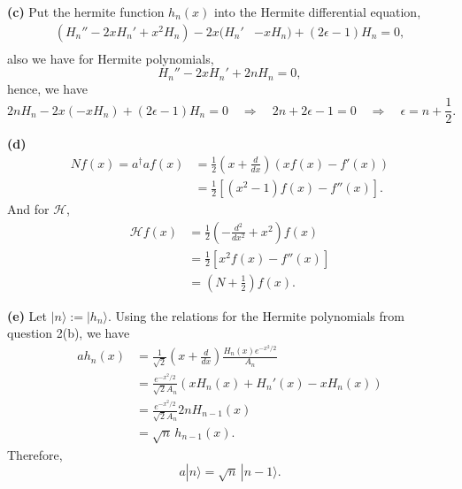 \documentclass[12pt]{article}
\begin{document}
\smallbreak
\noindent\textbf{(c)} \quad Put the hermite function $h_n(x)$ into the Hermite differential equation,
\begin{equation}
\begin{aligned}
    (H_n''-2xH_n'+x^2H_n) -2x(H_n'&-xH_n)+(2\epsilon -1)H_n = 0,\\
\end{aligned}
\end{equation}
also we have for Hermite polynomials,
\begin{equation}
    H_n''-2xH_n'+2nH_n = 0,
\end{equation}
hence, we have
\begin{equation}
    2nH_n - 2x(-xH_n) + (2\epsilon -1)H_n = 0 \quad \Longrightarrow \quad 2n + 2\epsilon -1 = 0 \quad \Longrightarrow \quad \epsilon = n + \frac{1}{2}.
\end{equation}  

\pagebreak
\noindent\textbf{(d)} \quad 
\begin{equation}
\begin{aligned}
    N f(x) = a^{\dagger}a f(x) &= \frac{1}{2} (x + \tfrac{d}{dx})(xf(x)-f'(x)) \\
    &= \frac{1}{2}[(x^2-1)f(x)-f''(x)].
\end{aligned}
\end{equation}
And for $\mathcal{H}$,
\begin{equation}
\begin{aligned}
    \mathcal{H}f(x) &= \frac{1}{2}(-\tfrac{d^2}{dx^2} + x^2)f(x)\\
    &= \frac{1}{2}[x^2f(x)-f''(x)]\\
    &= (N + \tfrac{1}{2})f(x).
\end{aligned}
\end{equation}

\smallbreak
\noindent\textbf{(e)} \quad 
Let $|n\rangle := |h_n\rangle$. Using the relations for the Hermite polynomials from question 2(b), we have
\begin{equation}
\begin{aligned}
a h_n(x)
&= \frac{1}{\sqrt{2}}\left(x+\frac{d}{dx}\right)
   \frac{H_n(x)e^{-x^2/2}}{A_n}\\
&= \frac{e^{-x^2/2}}{\sqrt{2}A_n}
   \left(xH_n(x)+H_n'(x)-xH_n(x)\right)\\
&= \frac{e^{-x^2/2}}{\sqrt{2}A_n}2nH_{n-1}(x)\\
&= \sqrt{n}\,h_{n-1}(x).
\end{aligned}
\end{equation}
Therefore,
\begin{equation}
a|n\rangle = \sqrt{n}\,|n-1\rangle.
\end{equation}
\end{document}
